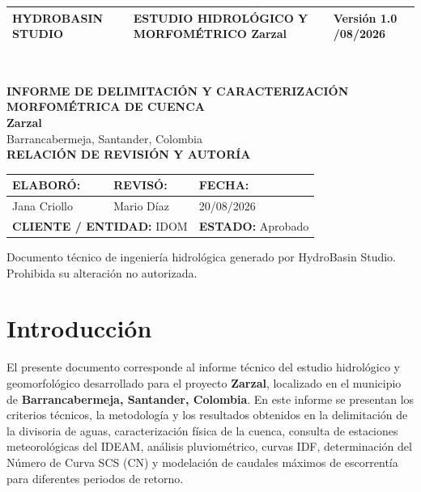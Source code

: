 \documentclass[11pt,a4paper]{article}
\begin{document}
\begin{titlepage}
\vspace*{0.8cm}
\noindent
\begin{tabular}{|p{4.0cm}|p{8.2cm}|p{3.4cm}|}\hline
\textbf{\color{hbaccent}HYDROBASIN STUDIO} & \textbf{ESTUDIO HIDROLÓGICO Y MORFOMÉTRICO} \newline \small Zarzal & \small Versión 1.0 \newline 20/08/2026 \\\hline
\end{tabular}\\[2.0cm]

\begin{center}
{\Huge\bfseries INFORME DE DELIMITACIÓN Y CARACTERIZACIÓN MORFOMÉTRICA DE CUENCA}\\[0.6cm]
{\Large\bfseries Zarzal}\\[0.3cm]
{\normalsize Barrancabermeja, Santander, Colombia}\\[2.2cm]

\textbf{RELACIÓN DE REVISIÓN Y AUTORÍA}\\[3mm]
\begin{tabular}{|p{4.5cm}|p{5.0cm}|p{4.5cm}|}\hline
\textbf{ELABORÓ:} & \textbf{REVISÓ:} & \textbf{FECHA:} \\\hline
Jana Criollo & Mario Díaz & 20/08/2026 \\\hline
\multicolumn{2}{|l|}{\textbf{CLIENTE / ENTIDAD:} IDOM} & \textbf{ESTADO:} Aprobado \\\hline
\end{tabular}
\end{center}

\vfill
\noindent
{\footnotesize Documento técnico de ingeniería hidrológica generado por HydroBasin Studio. Prohibida su alteración no autorizada.}
\end{titlepage}

\tableofcontents
\vspace{0.6cm}
\listoffigures
\vspace{0.6cm}
\listoftables
\newpage

\section{Introducción}
El presente documento corresponde al informe técnico del estudio hidrológico y geomorfológico desarrollado para el proyecto \textbf{Zarzal}, localizado en el municipio de \textbf{Barrancabermeja, Santander, Colombia}. En este informe se presentan los criterios técnicos, la metodología y los resultados obtenidos en la delimitación de la divisoria de aguas, caracterización física de la cuenca, consulta de estaciones meteorológicas del IDEAM, análisis pluviométrico, curvas IDF, determinación del Número de Curva SCS (CN) y modelación de caudales máximos de escorrentía para diferentes periodos de retorno.
\end{document}
